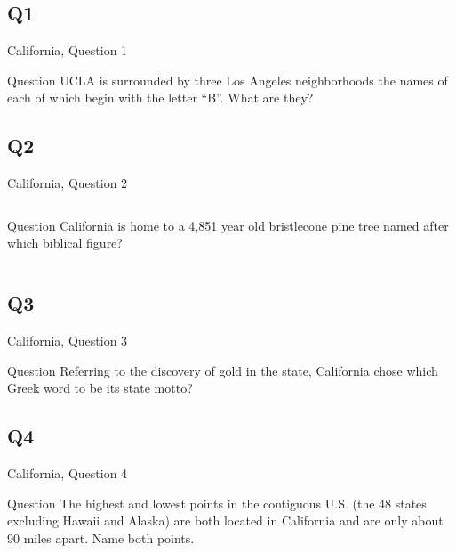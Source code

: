 \documentclass[11pt]{beamer}
\begin{document}
\subsection*{Q1}
\begin{frame}[t]{California, Question 1}
\begin{block}{Question}
UCLA is surrounded by three Los Angeles neighborhoods the names of each of which begin with the letter ``B''.  What are they?
\end{block}
\end{frame}
\subsection*{Q2}
\begin{frame}[t]{California, Question 2}
\begin{columns}[T,totalwidth=\linewidth]
\begin{column}{0.32\linewidth}
\begin{block}{Question}
California is home to a 4,851 year old bristlecone pine tree named after which biblical figure?
\end{block}
\end{column}
\begin{column}{0.65\linewidth}
\begin{center}
\texttt{[image: \{Images/methuselah]}.jpg}
\end{center}
\end{column}
\end{columns}
\end{frame}
\subsection*{Q3}
\begin{frame}[t]{California, Question 3}
\begin{block}{Question}
Referring to the discovery of gold in the state, California chose which Greek word to be its state motto?
\end{block}
\end{frame}
\subsection*{Q4}
\begin{frame}[t]{California, Question 4}
\begin{block}{Question}
The highest and lowest points in the contiguous U.S. (the 48 states excluding Hawaii and Alaska) are both located in California and are only about 90 miles apart. Name both points.
\end{block}
\end{frame}
\end{document}
